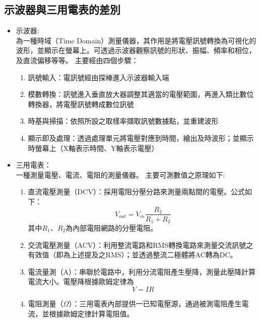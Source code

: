 \documentclass[12pt,a4paper]{article}
\begin{document}
\begin{CJK}{UTF8}{bkai}
\subsection{示波器與三用電表的差別}\label{subsec:2}

\begin{itemize}
    \item 示波器:\\
    為一種時域（Time Domain）測量儀器，其作用是將電壓訊號轉換為可視化的波形，並顯示在螢幕上。可透過示波器觀察訊號的形狀、振幅、頻率和相位，及直流偏移等等。
    \newline
    主要經由四個步驟：
    \begin{enumerate}
        \item 訊號輸入：電訊號經由探棒進入示波器輸入端
        \item 模數轉換：訊號進入垂直放大器調整其適當的電壓範圍，再進入類比數位轉換器，將電壓訊號轉成數位訊號
        \item 時基與掃描：依照所設之取樣率擷取訊號數據點，並重建波形
        \item 顯示即及處理：透過處理單元將電壓對應到時間，繪出及時波形；並顯示時螢幕上（X軸表示時間、Y軸表示電壓）
    \end{enumerate}
    \clearpage
    \item 三用電表：\\
    一種測量電壓、電流、電阻的測量儀器。
    \newline
    主要可測數值之原理如下:
    \begin{enumerate}
        \item 直流電壓測量（DCV）：採用電阻分壓分路來測量兩點間的電壓。公式如下：
        \begin{equation}
            V_{out} = V_{in} \frac{R_{2}}{R_{1}+R_{2}}
        \end{equation}
        其中$R_{1}$、$R_{2}$為內部電阻網路的分壓電阻。
        \item 交流電壓測量（ACV）：利用整流電路和RMS轉換電路來測量交流訊號之有效值（即為上述提及之RMS）；並透過整流二極體將AC轉為DC。
        \item 電流量測（A）：串聯於電路中，利用分流電阻產生壓降，測量此壓降計算電流大小。電壓降根據歐姆定律為
        \begin{equation}
            V = IR
        \end{equation}
        \item 電阻測量（$\Omega$）：三用電表內部提供一已知電壓源，通過被測電阻產生電流，並根據歐姆定律計算電阻值。
    \end{enumerate}

\end{itemize}
\end{CJK}
\end{document}
